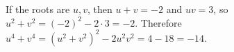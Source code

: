 If the roots are $u,v$, then $u+v=-2$ and $uv=3$, so $u^2+v^2=(-2)^2-2\cdot3=-2$. Therefore $u^4+v^4=(u^2+v^2)^2-2u^2v^2=4-18=\boxed{-14}$.
